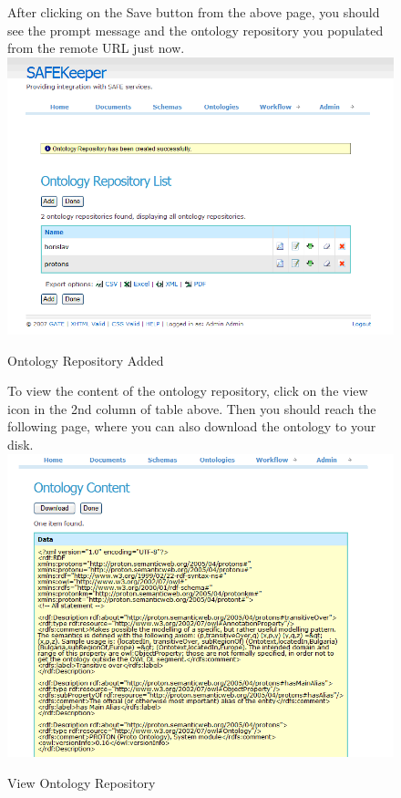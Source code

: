 \begin{figure}
After clicking on the Save button from the above page, you should see
the prompt message and the ontology repository you populated from the
remote URL just now.
\newline
\newline
\includegraphics[scale=0.4]{ontorepoadded}
\caption{Ontology Repository Added}
\label{fig:ontorepoadded}
\end{figure}

\begin{figure}
To view the content of the ontology repository, click on the view icon
in the 2nd column of table above. Then you should reach the following 
page, where you can also download the ontology to your disk.
\newline
\newline
\includegraphics[scale=0.4]{ontorepoview}
\caption{View Ontology Repository}
\label{fig:ontorepoview}
\end{figure}

